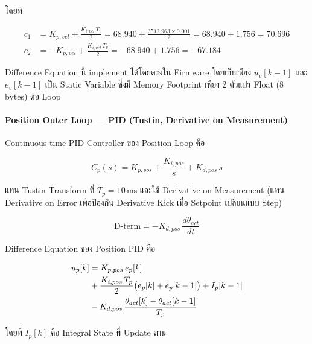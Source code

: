 \noindent โดยที่

\begin{align}
    c_1 &= K_{p,vel} + \frac{K_{i,vel}\,T_v}{2}
         = 68.940 + \frac{3512.963 \times 0.001}{2}
         = 68.940 + 1.756
         = 70.696
    \label{eq:c1_vel} \\[4pt]
    c_2 &= -K_{p,vel} + \frac{K_{i,vel}\,T_v}{2}
         = -68.940 + 1.756
         = -67.184
    \label{eq:c2_vel}
\end{align}

Difference Equation นี้ implement ได้โดยตรงใน Firmware
โดยเก็บเพียง $u_v[k-1]$ และ $e_v[k-1]$
เป็น Static Variable ซึ่งมี Memory Footprint
เพียง 2 ตัวแปร Float (8 bytes) ต่อ Loop

\paragraph{Position Outer Loop — PID (Tustin, Derivative on Measurement)}

Continuous-time PID Controller ของ Position Loop คือ

\begin{equation}
    C_p(s) = K_{p,pos} + \frac{K_{i,pos}}{s} + K_{d,pos}\,s
    \label{eq:Cp_ct}
\end{equation}

แทน Tustin Transform ที่ $T_p = 10$\,ms
และใช้ Derivative on Measurement
(แทน Derivative on Error เพื่อป้องกัน Derivative Kick
เมื่อ Setpoint เปลี่ยนแบบ Step)

\begin{equation}
    \text{D-term} = -K_{d,pos}\,\frac{d\theta_{act}}{dt}
    \label{eq:d_on_meas}
\end{equation}

Difference Equation ของ Position PID คือ

\begin{align}
    u_p[k] &= K_{p,pos}\,e_p[k] \notag \\
            &+ \frac{K_{i,pos}\,T_p}{2}
               \bigl(e_p[k] + e_p[k-1]\bigr)
               + I_p[k-1] \notag \\
            &- K_{d,pos}\,\frac{\theta_{act}[k] - \theta_{act}[k-1]}{T_p}
    \label{eq:pos_diff_eq}
\end{align}

\noindent โดยที่ $I_p[k]$ คือ Integral State ที่ Update ตาม

